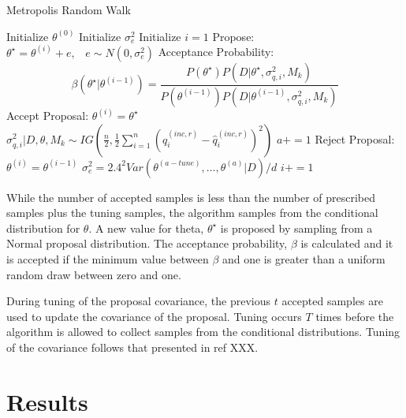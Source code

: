 \documentclass[article]{proc}
\begin{document}
        \begin{algorithm}
        \caption{Metropolis Random Walk}\label{alg:metropolis}
        \begin{algorithmic}[1]
        \State Initialize $\theta^{(0)}$
        \State Initialize $\sigma_e^2$
        \State Initialize $i = 1$
            \State Propose: $\theta^{\star} = \theta^{(i)} + e, \hspace{10pt} e \sim N(0, \sigma_e^2)$
            \State Acceptance Probability: $$\beta (\theta^{\star} | \theta^{(i-1)}) = \frac{P(\theta^{\star})P(D|\theta^{\star},\sigma_{q,i}^2,M_k)}{P(\theta^{(i-1)})P(D|\theta^{(i-1)},\sigma_{q,i}^2, M_k)}$$
                    \State Accept Proposal: $\theta^{(i)} = \theta^{\star}$
                    \State $\sigma_{q,i}^2 | D, \theta, M_k \sim IG \left(\frac{n}{2},  \frac{1}{2}\sum_{i=1}^n \left(q_i^{(inc,r)} - \hat{q}_i^{(inc,r)} \right)^2\right)$
                    \State $a+=1$
                \Else
                    \State Reject Proposal: $\theta^{(i)} = \theta^{(i-1)}$
                \EndIf
                \State $\sigma_e^2 = 2.4^2 Var(\theta^{(a-tune)}, \dots, \theta^{(a)}|D)/d$
            \EndWhile
            \State $i+=1$
        \EndWhile
        \end{algorithmic}
        \end{algorithm}

        While the number of accepted samples is less than the number of prescribed samples plus the tuning samples, the algorithm samples from the conditional distribution for $\theta$. A new value for theta, $\theta^{\star}$ is proposed by sampling from a Normal proposal distribution. The acceptance probability, $\beta$ is calculated and it is accepted if the minimum value between $\beta$ and one is greater than a uniform random draw between zero and one.

        During tuning of the proposal covariance, the previous $t$ accepted samples are used to update the covariance of the proposal. Tuning occurs $T$ times before the algorithm is allowed to collect samples from the conditional distributions. Tuning of the covariance follows that presented in ref XXX. 

\section{Results}
\end{document}
